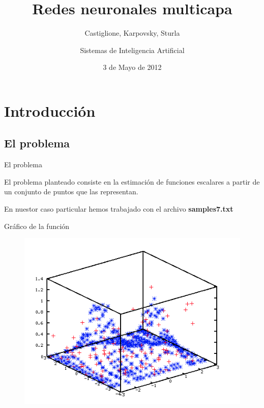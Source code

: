 \documentclass{beamer}
\title{Redes neuronales multicapa}
\subtitle{Castiglione, Karpovsky, Sturla }
\author{Sistemas de Inteligencia Artificial}
\date{3 de Mayo de 2012}
\begin{document}
\frame{\titlepage}

\section[Outline]{}
\frame{\tableofcontents}

\section{Introducción}
\subsection{El problema}
\begin{frame}{El problema}

\par El problema planteado consiste en la estimación de funciones escalares a partir de un conjunto de puntos que las representan.
\vspace{10px}
\par En nuestor caso particular hemos trabajado con el archivo \textbf{samples7.txt}

\end{frame}

\begin{frame}{Gráfico de la función}

\begin{figure}[H]
\begin{center}
\includegraphics[scale=0.50]{./images/funcion.png}
\label{modelado}
\end{center}
\end{figure}

\end{frame}
\end{document}

